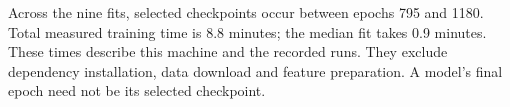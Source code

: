 Across the nine fits, selected checkpoints occur between epochs 795 and 1180. Total measured training time is 8.8 minutes; the median fit takes 0.9 minutes. These times describe this machine and the recorded runs. They exclude dependency installation, data download and feature preparation. A model's final epoch need not be its selected checkpoint.

